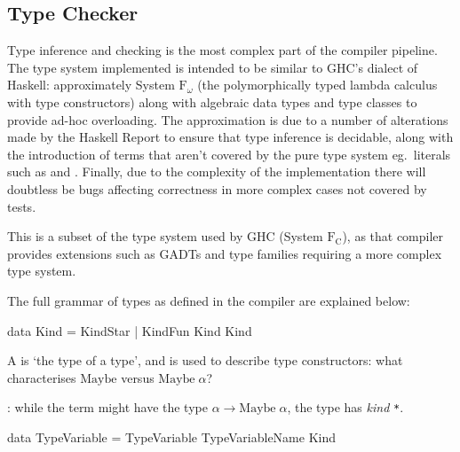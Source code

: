 \documentclass[dissertation.tex]{subfiles}
\begin{document}
{{{\begin{itemize}
{                
            }
            \end{itemize}
        }

    }
    \subsection{Type Checker}
    {

        Type inference and checking is the most complex part of the compiler pipeline. The type system implemented is
        intended to be similar to GHC's dialect of Haskell: approximately System \(\text{F}_\omega\) (the
        polymorphically typed lambda calculus with type constructors) along with algebraic data types and type classes
        to provide ad-hoc overloading. The approximation is due to a number of alterations made by the Haskell Report to
        ensure that type inference is decidable, along with the introduction of terms that aren't covered by the pure
        type system eg.\ literals such as  and . Finally, due to the complexity of the
        implementation there will doubtless be bugs affecting correctness in more complex cases not covered by tests.
        
        This is a subset of the type system used by GHC (System \(\text{F}_\text{C}\)), as that compiler provides
        extensions such as GADTs and type families requiring a more complex type system.

        The full grammar of types as defined in the compiler are explained below:

        \begin{haskellfigure}
        data Kind = KindStar
                  | KindFun Kind Kind
        \end{haskellfigure}

        A  is `the type of a type', and is used to describe type constructors: what characterises
        \(\text{Maybe}\) versus \(\text{Maybe}\;\alpha\)?
        
        : while the term  might have the type
        \(\alpha\rightarrow\text{Maybe}\;\alpha\), the type has \textit{kind} \texttt{*}. 



        \begin{haskellfigure}
        data TypeVariable = TypeVariable TypeVariableName Kind


\end{haskellfigure}}}
\end{document}
